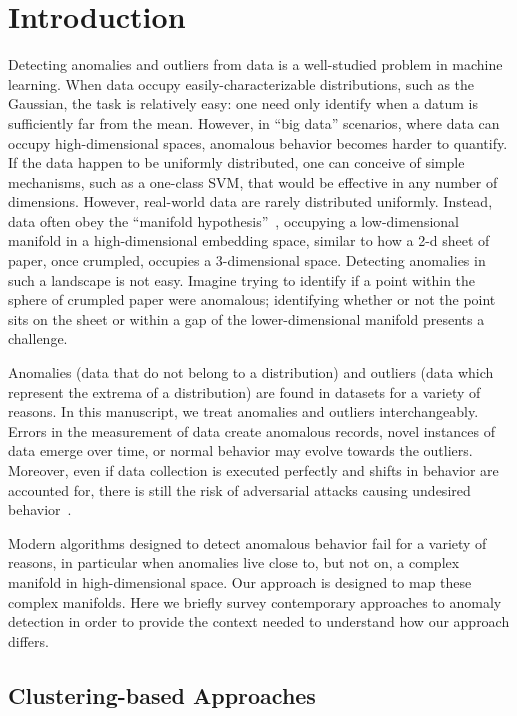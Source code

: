 \section{Introduction}
\label{sec:introduction}

Detecting anomalies and outliers from data is a well-studied problem in machine learning.
When data occupy easily-characterizable distributions, such as the Gaussian, the task is relatively easy:
one need only identify when a datum is sufficiently far from the mean.
However, in ``big data'' scenarios, where data can occupy high-dimensional spaces, anomalous behavior becomes harder to quantify.
If the data happen to be uniformly distributed, one can conceive of simple mechanisms, such as a one-class SVM, that would be effective in any number of dimensions.
However, real-world data are rarely distributed uniformly.
Instead, data often obey the ``manifold hypothesis''~\cite{fefferman2016testing}, occupying a low-dimensional manifold in a high-dimensional embedding space, similar to how a 2-d sheet of paper, once crumpled, occupies a 3-dimensional space.
Detecting anomalies in such a landscape is not easy.
Imagine trying to identify if a point within the sphere of crumpled paper were anomalous; identifying whether or not the point sits on the sheet or within a gap of the lower-dimensional manifold presents a challenge.

Anomalies (data that do not belong to a distribution) and outliers (data which represent the extrema of a distribution) are found in datasets for a variety of reasons.
In this manuscript, we treat anomalies and outliers interchangeably.
Errors in the measurement of data create anomalous records,
novel instances of data emerge over time,
or normal behavior may evolve towards the outliers.
Moreover, even if data collection is executed perfectly and shifts in behavior are accounted for, there is still the risk of adversarial attacks causing undesired behavior~\cite{elsayed2018adversarial}.

Modern algorithms designed to detect anomalous behavior fail for a variety of reasons, in particular when anomalies live close to, but not on, a complex manifold in high-dimensional space.
Our approach is designed to map these complex manifolds.
Here we briefly survey contemporary approaches to anomaly detection in order to provide the context needed to understand how our approach differs.


\subsection{Clustering-based Approaches}
\label{subsec:introduction:clustering-based-approaches}

